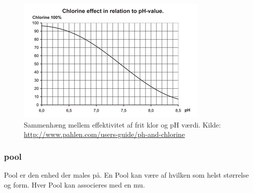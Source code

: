 \begin{figure}
	\centering
	\includegraphics[width=0.6\linewidth]{figs/chlorinePh.png}
	\caption{Sammenhæng mellem effektivitet af frit klor og pH værdi. Kilde: \url{http://www.pahlen.com/users-guide/ph-and-chlorine}}
	\label{fig:chlorinePh}
\end{figure}


\subsubsection{\gls{pool}}
Pool er den enhed der males på. En Pool kan være af hvilken som helst størrelse og form. Hver Pool kan associeres med en \gls{mu}.
